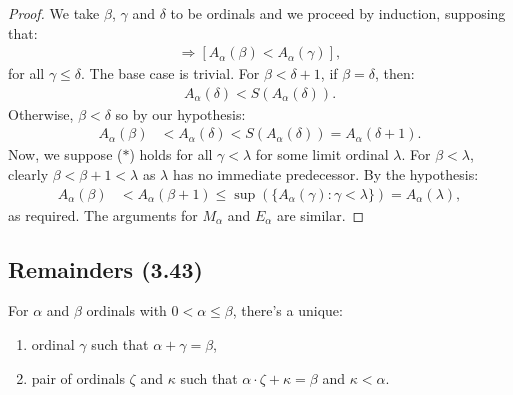 \begin{proof}
    We take $\beta$, $\gamma$ and $\delta$ to be ordinals and we proceed by induction,
    supposing that: \begin{align*}
        [\beta < \gamma] \Longrightarrow [A_\alpha(\beta) < A_\alpha(\gamma)], \tag{$\ast$}
    \end{align*} for all $\gamma \leq \delta$. The base case is trivial. 
    For $\beta < \delta + 1$, if $\beta = \delta$, then: \begin{align*}
        A_\alpha(\delta) < S(A_\alpha(\delta)).
    \end{align*} Otherwise, $\beta < \delta$ so by our hypothesis: \begin{align*}
        A_\alpha(\beta) &< A_\alpha(\delta) < S(A_\alpha(\delta)) = A_\alpha(\delta + 1). 
    \end{align*} Now, we suppose ($\ast$) holds for all $\gamma < \lambda$ for some 
    limit ordinal $\lambda$. For $\beta < \lambda$, clearly $\beta < \beta + 1 < \lambda$ 
    as $\lambda$ has no immediate predecessor. By the hypothesis: \begin{align*}
        A_\alpha(\beta) &< A_\alpha(\beta + 1) 
        \leq \sup(\{A_\alpha(\gamma) : \gamma < \lambda\}) 
        = A_\alpha(\lambda),
    \end{align*} as required. The arguments for $M_\alpha$ and $E_\alpha$ are 
    similar.
\end{proof}

\subsection{Remainders (3.43)} \label{3.43}

For $\alpha$ and $\beta$ ordinals with $0 < \alpha \leq \beta$, there's a unique: \begin{enumerate}
    \item ordinal $\gamma$ such that $\alpha + \gamma = \beta$,
    \item pair of ordinals $\zeta$ and $\kappa$ such that
        $\alpha \cdot \zeta + \kappa = \beta$ and $\kappa < \alpha$.
\end{enumerate} 

